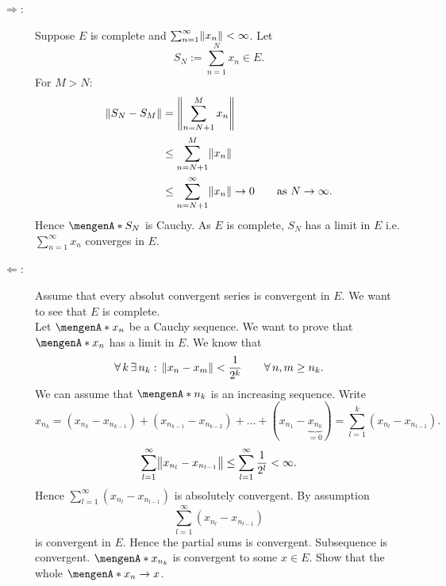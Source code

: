 \begin{beweis}
	\begin{description}
		\item[$\Rightarrow$:] Suppose $E$ is complete and $\sum_{n=1}^{\infty}\norm{x_n} < \infty$. Let 
		\[
			S_N := \sum_{n=1}^{N}x_n \in E.
		\] 
		For $M >N$:
		\begin{align*}
			\norm{S_N-S_M} &= \norm{\sum_{n=N+1}^{M}x_n} \\
			&\leq \sum_{n=N+1}^{M} \norm{x_n} \\
			&\leq \sum_{n=N+1}^{\infty} \norm{x_n} \to 0 \qquad \text{as }N \to \infty.
		\end{align*}
		Hence $\set{S_N}$ is Cauchy. As $E$ is complete, $S_N$ has a limit in $E$ i.e. $\sum_{n=1}^{\infty}x_n$ converges in $E$.
		\item[$\Leftarrow$:] Assume that every absolut convergent series is convergent in $E$. We want to see that $E$ is complete. \\
		Let $\set{x_n}$ be a Cauchy sequence. We want to prove that $\set{x_n}$ has a limit in $E$. We know that
		\[
			\forall\, k \,\exists\,n_k: \, \norm{x_n-x_m}< \frac{1}{2^k} \qquad \forall\, n,m \geq n_k.
		\]
		We can assume that $\set{n_k}$ is an increasing sequence. Write
		\[
			x_{n_k} = (x_{n_k}-x_{n_{k-1}})+ (x_{n_{k-1}}-x_{n_{k-2}}) + \dots +(x_{n_1}-\underset{=0}{\underbrace{x_{n_0}}}) = \sum_{l=1}^{k}(x_{n_l}-x_{n_{l-1}}).
		\]
		\[
			\sum_{l=1}^{\infty}\norm{x_{n_l}-x_{n_{l-1}}} \leq \sum_{l=1}^{\infty}\frac{1}{2^l} < \infty.
		\]
		Hence $\sum_{l=1}^{\infty}(x_{n_l}-x_{n_{l-1}})$ is absolutely convergent. By assumption 
		\[
			\sum_{l=1}^{\infty}(x_{n_l}-x_{n_{l-1}}) 
		\]
		is convergent in $E$. Hence the partial sums is convergent. Subsequence is convergent. $\set{x_{n_k}}$ is convergent to some $x \in E$.
		 Show that the whole $\set{x_n} \to x$.
	\end{description}
\end{beweis}